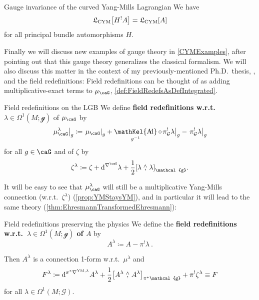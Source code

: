 \documentclass[reqno,a4paper,oneside]{amsart}
\newcommand\mutot{\mu_\caG}
\theoremstyle{plain}
\theoremstyle{remark}
\theoremstyle{definition}
\DeclareMathOperator{\sAd}{\mathKel{A\mkern-5.5mu d}}
\begin{document}
\begin{theorems*}{Gauge invariance of the curved Yang-Mills Lagrangian}
We have
\begin{equation*}
\mathfrak{L}_{\mathrm{CYM}}\mleft[ H^!A \mright]
=
\mathfrak{L}_{\mathrm{CYM}}[A]
\end{equation*}
for all principal bundle automorphisms $H$.
\end{theorems*}

Finally we will discuss new examples of gauge theory in \ref{CYMExamples}, after pointing out that this gauge theory generalizes the classical formalism. We will also discuss this matter in the context of my previously-mentioned Ph.D.\ thesis, \cite{MyThesis}, and the field redefinitions: Field redefinitions can be thought of as adding multiplicative-exact terms to $\mutot$, \ref{def:FieldRedefsAsDefIntegrated}.

\begin{definitions*}{Field redefinitions on the LGB}
We define \textbf{field redefinitions w.r.t.\ $\lambda \in \Omega^1(M; \mathcal{g})$} of $\mutot$ by
\begin{equation*}
\mleft.\mutot^{\lambda}\mright|_g
\coloneqq
\mleft.\mutot\mright|_g
	+ \sAd_{g^{-1}} \circ \mleft. \pi_{\mathcal{G}}^!\lambda\mright|_g
	- \mleft.\pi_{\mathcal{G}}^!\lambda\mright|_g
\end{equation*}
for all $g \in \caG$
and of $\zeta$ by
\begin{equation*}
\zeta^\lambda
\coloneqq
\zeta
	+ \mathrm{d}^{\nabla^\caG}\lambda + \frac{1}{2} \mleft[ \lambda \stackrel{\wedge}{,} \lambda \mright]_{\mathcal{g}}.
\end{equation*}
\end{definitions*}

It will be easy to see that $\mutot^{\lambda}$ will still be a multiplicative Yang-Mills connection (w.r.t.\ $\zeta^\lambda$) (\ref{prop:YMStaysYM}), and in particular it will lead to the same theory (\ref{thm:EhresmannTransformedEhresmann}):

\begin{theorems*}{Field redefinitions preserving the physics}
We define the \textbf{field redefinitions w.r.t.\ $\lambda \in \Omega^1(M; \mathcal{g})$ of $A$} by
\begin{equation*}
A^\lambda
\coloneqq
A - \pi^!\lambda ~.
\end{equation*}

Then $A^\lambda$ is a connection 1-form w.r.t.\ $\mu^{\lambda}$ and
\begin{equation*}
F^\lambda
\coloneqq
\mathrm{d}^{\pi^*\nabla^{\mathrm{YM},\lambda}} A^\lambda
	+ \frac{1}{2} \mleft[ A^\lambda \stackrel{\wedge}{,} A^\lambda \mright]_{\pi^*\mathcal{g}}
	+ \pi^!\zeta^\lambda
\equiv
F
\end{equation*}
for all $\lambda \in \Omega^1(M; \mathcal{G})$. 
\end{theorems*}
\end{document}
